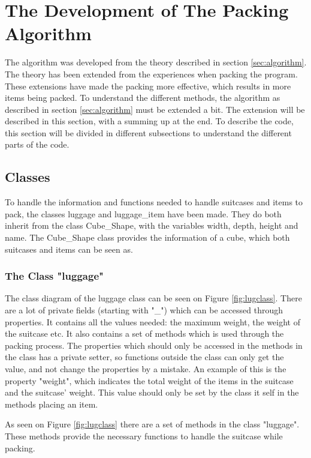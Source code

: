 \section{The Development of The Packing Algorithm}
\label{sec:devalgorithm}
The algorithm was developed from the theory described in section \ref{sec:algorithm}. The theory has been extended from the experiences when packing the program. These extensions have made the packing more effective, which results in more items being packed. 
To understand the different methods, the algorithm as described in section \ref{sec:algorithm} must be extended a bit. The extension will be described in this section, with a summing up at the end. To describe the code, this section will be divided in different subsections to understand the different parts of the code.

\subsection{Classes}
To handle the information and functions needed to handle suitcases and items to pack, the classes luggage and luggage\_item have been made. They do both inherit from the class Cube\_Shape, with the variables width, depth, height and name. The Cube\_Shape class provides the information of a cube, which both suitcases and items can be seen as.
\subsubsection{The Class "luggage"}
The class diagram of the luggage class can be seen on Figure \ref{fig:lugclass}. There are a lot of private fields (starting with "\_") which can be accessed through properties. It contains all the values needed: the maximum weight, the weight of the suitcase etc. It also contains a set of methods which is used through the packing process. The properties which should only be accessed in the methods in the class has a private setter, so functions outside the class can only get the value, and not change the properties by a mistake. An example of this is the property "weight", which indicates the total weight of the items in the suitcase and the suitcase' weight. This value should only be set by the class it self in the methods placing an item.


As seen on Figure \ref{fig:lugclass} there are a set of methods in the class "luggage". These methods provide the necessary functions to handle the suitcase while packing.

